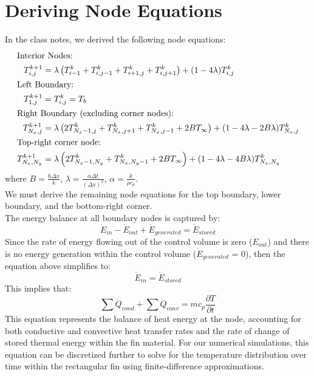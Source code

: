 \documentclass{article}
\newcommand{\pderiv}[2]{\displaystyle \frac{\partial #1}{\partial #2}}
\newcommand{\ddfrac}[2]{\frac{\displaystyle #1}{\displaystyle #2}}
\begin{document}
\section{Deriving Node Equations}

In the class notes, we derived the following node equations:
\begin{align}
    \shortintertext{Interior Nodes:}
    T_{i,j}^{k+1}     & = \lambda\left(T_{i-1}^k + T_{i,j-1}^k + T_{i+1,j}^k + T_{i,j+1}^k\right) + (1-4\lambda)T_{i,j}^k                         \\
    \shortintertext{Left Boundary:}
    T_{1,j}^{k+1}     & = T_{i,j}^k = T_b \\
    \shortintertext{Right Boundary (excluding corner nodes):}
    T_{N_x,j}^{k+1}   & = \lambda\left(2T_{N_x-1,j}^k + T_{N_x,j+1}^k + T_{N_x,j-1}^k + 2BT_{\infty}\right) + (1-4\lambda - 2B\lambda)T_{N_x,j}^k \\
    \shortintertext{Top-right corner node:}
    T_{N_x,N_y}^{k+1} & = \lambda\left(2T_{N_x-1,N_y}^k + T_{N_x,N_y-1}^k + 2BT_{\infty}\right) + (1-4\lambda - 4B\lambda)T_{N_x,N_y}^k
\end{align}
where $B = \ddfrac{h \Delta x}{k}$, $\lambda = \ddfrac{\alpha \Delta t}{(\Delta x)^2}$, $\alpha = \ddfrac{k}{\rho c_p}$.\\

We must derive the remaining node equations for the top boundary, lower boundary, and the bottom-right corner.\\

The energy balance at all boundary nodes is captured by:
\[
\dot{E}_{in} - \dot{E}_{out} + \dot{E}_{generated} = \dot{E}_{stored}    
\]
Since the rate of energy flowing out of the control volume is zero ($\dot{E}_{out}$) and there is no energy generation within the control volume ($\dot{E}_{generated}$ = 0), then the equation above simplifies to:
\[
\dot{E}_{in} = \dot{E}_{stored}    
\]
This implies that:
\begin{equation}
    \sum{\dot{Q}_{cond}} + \sum{\dot{Q}_{conv}} = m c_p \pderiv{T}{t}
    \label{eq:energy}
\end{equation}  
This equation represents the balance of heat energy at the node, accounting for both conductive and convective heat transfer rates and the rate of change of stored thermal energy within the fin material. For our numerical simulations, this equation can be discretized further to solve for the temperature distribution over time within the rectangular fin using finite-difference approximations.
\end{document}

